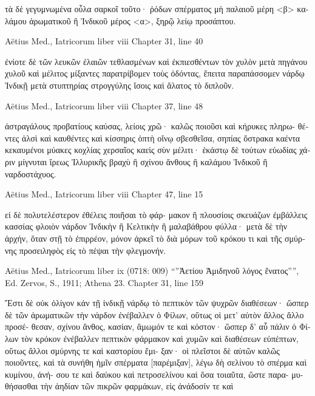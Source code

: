 \documentclass[12pt,letterpaper,twoside,final]{memoir}
\begin{document}
\begin{greek}
                                                  τὰ δὲ γεγυμνωμένα οὖλα σαρκοῖ 
τοῦτο· ῥόδων σπέρματος μὴ παλαιοῦ μέρη <β> καλάμου ἀρωματικοῦ ἢ 
Ἰνδικοῦ μέρος <α>, ξηρῷ λείῳ προσάπτου. 



Aëtius Med., Iatricorum liber viii 
Chapter 31, line 40

                                                                             ἐνίοτε 
δὲ τῶν λευκῶν ἐλαιῶν τεθλασμένων καὶ ἐκπιεσθέντων τὸν χυλὸν μετὰ 
πηγάνου χυλοῦ καὶ μέλιτος μίξαντες παρατρίβομεν τοὺς ὀδόντας, 
ἔπειτα παραπάσσομεν νάρδῳ Ἰνδικῇ μετὰ στυπτηρίας στρογγύλης ἴσοις 
καὶ ἅλατος τὸ διπλοῦν. 



Aëtius Med., Iatricorum liber viii 
Chapter 37, line 48

                                                                ἀστραγάλους 
προβατίους καύσας, λείοις χρῶ· καλῶς ποιοῦσι καὶ κήρυκες πληρω-
θέντες ἁλσὶ καὶ καυθέντες καὶ κίσσηρις ὀπτὴ οἴνῳ σβεσθεῖσα, σηπίας 
ὄστρακα καέντα κεκαυμένοι μύακες κοχλίας χερσαῖος καεὶς σὺν μέλιτι·   
ἑκάστῳ δὲ τούτων εὐωδίας χάριν μίγνυται ἴρεως Ἰλλυρικῆς βραχὺ ἢ 
σχίνου ἄνθους ἢ καλάμου Ἰνδικοῦ ἢ ναρδοστάχυος. 



Aëtius Med., Iatricorum liber viii 
Chapter 47, line 15

                              εἰ δὲ πολυτελέστερον ἐθέλεις ποιῆσαι τὸ φάρ-
μακον ἢ πλουσίοις σκευάζων ἐμβάλλεις κασσίας φλοιὸν νάρδον Ἰνδικὴν 
ἢ Κελτικὴν ἢ μαλαβάθρου φύλλα· μετὰ δὲ τὴν ἀρχήν, ὅταν στῇ τὸ 
ἐπιρρέον, μόνον ἀρκεῖ τὸ διὰ μόρων τοῦ κρόκου τι καὶ τῆς σμύρνης 
προσειληφὸς εἰς τὸ πέψαι τὴν φλεγμονήν. 



Aëtius Med., Iatricorum liber ix (0718: 009)
“”Ἀετίου Ἀμιδηνοῦ λόγος ἔνατος””, Ed. Zervos, S., 1911; Athena 23.
Chapter 31, line 159

                               Ἔστι δὲ οὐκ ὀλίγον κἀν τῇ ἰνδικῇ νάρδῳ 
τὸ πεπτικὸν τῶν ψυχρῶν διαθέσεων· ὥσπερ δὲ τῶν ἀρωματικῶν τὴν 
νάρδον ἐνέβαλλεν ὁ Φίλων, οὕτως οἱ μετ' αὐτὸν ἄλλος ἄλλο προσέ-  
θεσαν, σχίνου ἄνθος, κασίαν, ἄμωμόν τε καὶ κόστον· ὥσπερ δ' αὖ 
πάλιν ὁ Φίλων τὸν κρόκον ἐνέβαλλεν πεπτικὸν φάρμακον καὶ χυμῶν 
καὶ διαθέσεων εὐπέπτων, οὕτως ἄλλοι σμύρνης τε καὶ καστορίου ἔμι-
ξαν· οἱ πλεῖστοι δὲ αὐτῶν καλῶς ποιοῦντες, καὶ τὰ συνήθη ἡμῖν 
σπέρματα [παρέμιξαν], λέγω δὴ σελίνου τὸ σπέρμα καὶ κυμίνου, ἀνή-
σου τε καὶ δαύκου καὶ πετροσελίνου καὶ ὅσα τοιαῦτα, ὥστε παρα-
μυθήσασθαι τὴν ἀηδίαν τῶν πικρῶν φαρμάκων, εἰς ἀνάδοσίν τε καὶ 





\end{greek}
\end{document}
